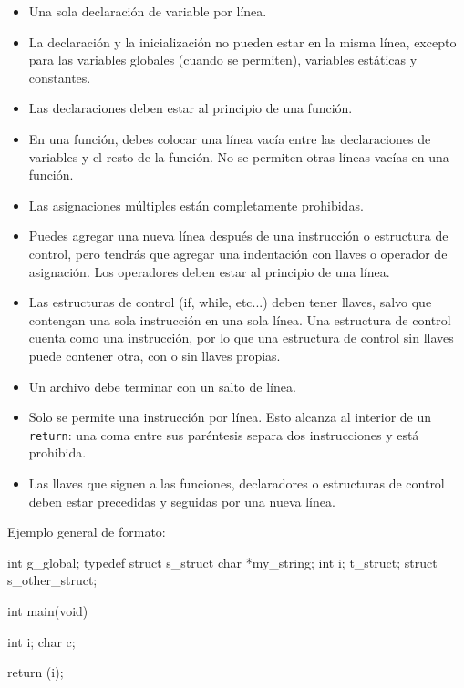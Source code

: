 \documentclass{42-es}
\begin{document}
\begin{itemize}
      \item Una sola declaración de variable por línea.
      \item La declaración y la inicialización no pueden estar en la misma
            línea,
            excepto para las variables globales (cuando se permiten), variables
            estáticas y
            constantes.
      \item Las declaraciones deben estar al principio de una función.
      \item En una función, debes colocar una línea vacía entre las
            declaraciones
            de variables y el resto de la función. No se permiten otras líneas
            vacías en una función.
      \item Las asignaciones múltiples están completamente prohibidas.
      \item Puedes agregar una nueva línea después de una instrucción o
            estructura
            de control, pero tendrás que agregar una indentación con llaves o
            operador de asignación. Los operadores deben estar al principio de
            una línea.
      \item Las estructuras de control (if, while, etc...) deben tener llaves,
            salvo que contengan una sola instrucción en una sola línea. Una
            estructura de control cuenta como una instrucción, por lo que una
            estructura de control sin llaves puede contener otra, con o sin
            llaves propias.

            \item Un archivo debe terminar con un salto de línea.

            \item Solo se permite una instrucción por línea. Esto alcanza al
            interior de un \texttt{return}: una coma entre sus paréntesis separa
            dos instrucciones y está prohibida.
      \item Las llaves que siguen a las funciones, declaradores o estructuras
            de
            control deben estar precedidas y seguidas por una nueva línea.

\end{itemize}

Ejemplo general de formato:
\begin{42ccode}
      int	g_global;
      typedef struct	s_struct
      {
      char    *my_string;
      int     i;
      } 	t_struct;
      struct		s_other_struct;

      int main(void)
      {
                  int	  i;
                  char	  c;

                  return (i);
            }
\end{42ccode}
\newpage
\end{document}
